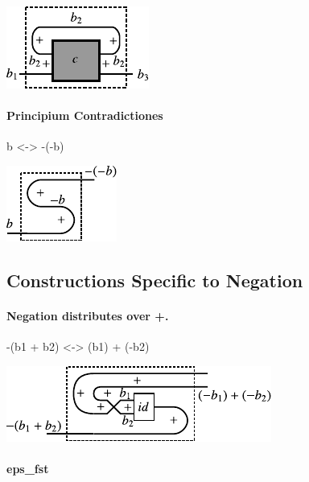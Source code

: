 \documentclass[preprint]{sigplanconf}
\begin{document}
\begin{center}
  \includegraphics{diagrams/trace.pdf}
\end{center}

\paragraph*{Principium Contradictiones}

{{b <-> -(-b)}}

\begin{center}
  \includegraphics{diagrams/double_neg.pdf}
\end{center}

\subsection{Constructions Specific to Negation}
\label{sec:neg-constructions}

\paragraph*{Negation distributes over {{+}}. }

{{-(b1 + b2) <-> (b1) + (-b2)}}

\begin{center}
  \includegraphics{diagrams/dist_neg_plus.pdf}
\end{center}

\paragraph*{ {{eps_{fst} }} }
\end{document}

